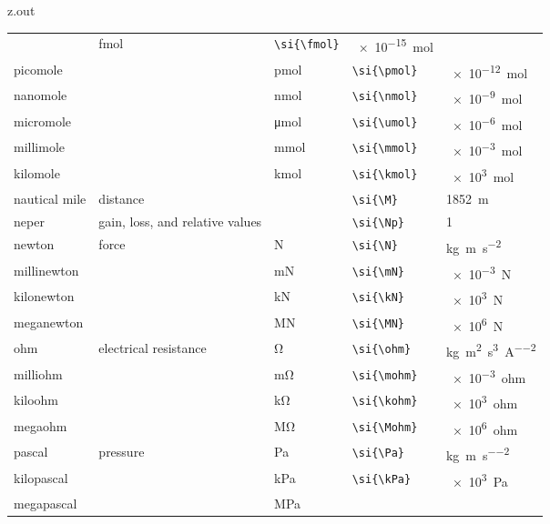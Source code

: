 \begin{VerbatimOut}{z.out}
{\begin{longtable}{@{}P{1.4in}P{1in}llP{1.8in}@{}}
      \ditto&
      \si{\fmol}&
      \verb+\si{\fmol}+&
      \SI{e-15}{\mol}\\
    \quad picomole&
      \ditto&
      \si{\pmol}&
      \verb+\si{\pmol}+&
      \SI{e-12}{\mol}\\
    \quad nanomole&
      \ditto&
      \si{\nmol}&
      \verb+\si{\nmol}+&
      \SI{e-9}{\mol}\\
    \quad micromole&
      \ditto&
      \si{\umol}&
      \verb+\si{\umol}+&
      \SI{e-6}{\mol}\\
    \quad millimole&
      \ditto&
      \si{\mmol}&
      \verb+\si{\mmol}+&
      \SI{e-3}{\mol}\\
    \quad kilomole&
      \ditto&
      \si{\kmol}&
      \verb+\si{\kmol}+&
      \SI{e3}{\mol}\\
    \vsp
    nautical mile&
      distance&
      \si{\M}&
      \verb+\si{\M}+&
      \SI{1852}{\m}\\
    \vsp
    neper&
      gain, loss, and relative values&
      \si{\Np}&
      \verb+\si{\Np}+&
      1\\
    \vsp
    newton&
      force&
      \si{\N}&
      \verb+\si{\N}+&
      \si{\kg\m\per\s\squared}\\
    \quad millinewton&
      \ditto&
      \si{\mN}&
      \verb+\si{\mN}+&
      \SI{e-3}{\N}\\
    \quad kilonewton&
      \ditto&
      \si{\kN}&
      \verb+\si{\kN}+&
      \SI{e3}{\N}\\
    \quad meganewton&
      \ditto&
      \si{\MN}&
      \verb+\si{\MN}+&
      \SI{e6}{\N}\\
    \vsp
    ohm&
      electrical resistance&
      \si{\ohm}&
      \verb+\si{\ohm}+&
      \si{\kg\m\squared\per\s\cubed\per\A\squared}\\
    \quad milliohm&
      \ditto&
      \si{\mohm}&
      \verb+\si{\mohm}+&
      \SI{e-3}{ohm}\\
    \quad kiloohm&
      \ditto&
      \si{\kohm}&
      \verb+\si{\kohm}+&
      \SI{e3}{ohm}\\
    \quad megaohm&
      \ditto&
      \si{\Mohm}&
      \verb+\si{\Mohm}+&
      \SI{e6}{ohm}\\
    \vsp
    pascal&
      pressure&
      \si{\Pa}&
      \verb+\si{\Pa}+&
      \si{\kg\per\m\per\s\squared}\\
    \qquad kilopascal&
      \ditto&
      \si{\kPa}&
      \verb+\si{\kPa}+&
      \SI{e3}{\Pa}\\
    \qquad megapascal&
      \ditto&
      \si{\MPa}&

\end{longtable}}
\end{VerbatimOut}
